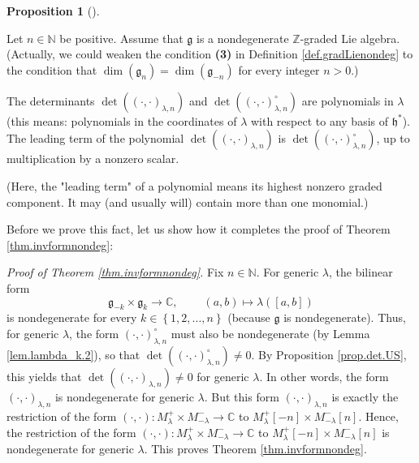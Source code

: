 \documentclass
[numbers=enddot,12pt,final,onecolumn,german,notitlepage]{scrartcl}%
\theoremstyle{definition}
\newtheorem{prop}[theo]{Proposition}
\newenvironment{proposition}[1][]
{\begin{prop}[#1]\begin{leftbar}}
{\end{leftbar}\end{prop}}
\begin{document}
\begin{proposition}
\label{prop.det.US}Let $n\in\mathbb{N}$ be positive. Assume that
$\mathfrak{g}$ is a nondegenerate $\mathbb{Z}$-graded Lie algebra. (Actually,
we could weaken the condition \textbf{(3)} in Definition
\ref{def.gradLienondeg} to the condition that $\dim\left(  \mathfrak{g}%
_{n}\right)  =\dim\left(  \mathfrak{g}_{-n}\right)  $ for every integer $n>0$.)

The determinants $\det\left(  \left(  \cdot,\cdot\right)  _{\lambda,n}\right)
$ and $\det\left(  \left(  \cdot,\cdot\right)  _{\lambda,n}^{\circ}\right)  $
are polynomials in $\lambda$ (this means: polynomials in the coordinates of
$\lambda$ with respect to any basis of $\mathfrak{h}^{\ast}$). The leading
term of the polynomial $\det\left(  \left(  \cdot,\cdot\right)  _{\lambda
,n}\right)  $ is $\det\left(  \left(  \cdot,\cdot\right)  _{\lambda,n}^{\circ
}\right)  $, up to multiplication by a nonzero scalar.

(Here, the "leading term" of a polynomial means its highest nonzero graded
component. It may (and usually will) contain more than one monomial.)
\end{proposition}

Before we prove this fact, let us show how it completes the proof of Theorem
\ref{thm.invformnondeg}:

\textit{Proof of Theorem \ref{thm.invformnondeg}.} Fix $n\in\mathbb{N}$. For
generic $\lambda$, the bilinear form%
\[
\mathfrak{g}_{-k}\times\mathfrak{g}_{k}\rightarrow\mathbb{C}%
,\ \ \ \ \ \ \ \ \ \ \left(  a,b\right)  \mapsto\lambda\left(  \left[
a,b\right]  \right)
\]
is nondegenerate for every $k\in\left\{  1,2,...,n\right\}  $ (because
$\mathfrak{g}$ is nondegenerate). Thus, for generic $\lambda$, the form
$\left(  \cdot,\cdot\right)  _{\lambda,n}^{\circ}$ must also be nondegenerate
(by Lemma \ref{lem.lambda_k.2}), so that $\det\left(  \left(  \cdot
,\cdot\right)  _{\lambda,n}^{\circ}\right)  \neq0$. By Proposition
\ref{prop.det.US}, this yields that $\det\left(  \left(  \cdot,\cdot\right)
_{\lambda,n}\right)  \neq0$ for generic $\lambda$. In other words, the form
$\left(  \cdot,\cdot\right)  _{\lambda,n}$ is nondegenerate for generic
$\lambda$. But this form $\left(  \cdot,\cdot\right)  _{\lambda,n}$ is exactly
the restriction of the form $\left(  \cdot,\cdot\right)  :M_{\lambda}%
^{+}\times M_{-\lambda}^{-}\rightarrow\mathbb{C}$ to $M_{\lambda}^{+}\left[
-n\right]  \times M_{-\lambda}^{-}\left[  n\right]  $. Hence, the restriction
of the form $\left(  \cdot,\cdot\right)  :M_{\lambda}^{+}\times M_{-\lambda
}^{-}\rightarrow\mathbb{C}$ to $M_{\lambda}^{+}\left[  -n\right]  \times
M_{-\lambda}^{-}\left[  n\right]  $ is nondegenerate for generic $\lambda$.
This proves Theorem \ref{thm.invformnondeg}.
\end{document}
